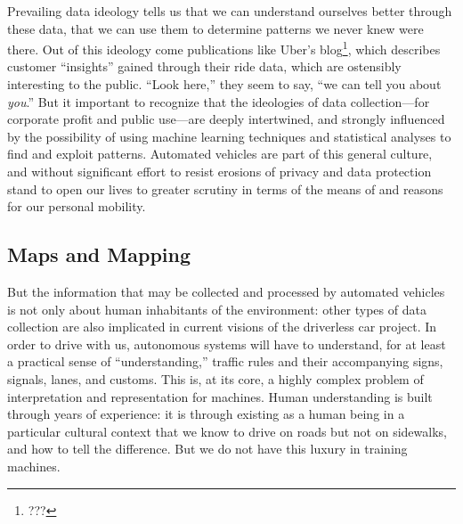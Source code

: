 Prevailing data ideology tells us that we can understand ourselves better through
these data, that we can use them to determine patterns we never knew were
there. Out of this ideology come publications like Uber's blog\footnote{???}, which
describes customer ``insights'' gained through their ride data, which
are ostensibly interesting to the public. ``Look here,'' they seem to
say, ``we can tell you about \emph{you}.'' But it important to
recognize that the ideologies of data collection---for corporate
profit and public use---are deeply intertwined, and strongly
influenced by the possibility of using machine learning techniques and
statistical analyses to find and exploit patterns. Automated vehicles
are part of this general culture, and without significant effort to
resist erosions of privacy and data protection stand to open our lives
to greater scrutiny in terms of the means of and reasons for our
personal mobility.



\subsection{Maps and Mapping}

But the information that may be collected and processed by automated
vehicles is not only about human inhabitants of the environment: other
types of data collection are also implicated in current
visions of the driverless car project. In order to drive with us,
autonomous systems will have to understand,
for at least a practical sense of ``understanding,'' traffic rules and
their accompanying signs, signals, lanes, and customs. This is, at its
core, a highly complex problem of interpretation and representation
for machines. Human understanding is built
through years of experience: it is through existing as a human being
in a particular cultural context that we know to drive on roads but
not on sidewalks, and how to tell the difference. But we do not have
this luxury in training machines.


